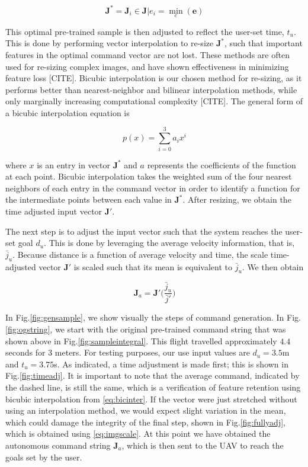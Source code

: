\documentclass[letterpaper, 10 pt, conference]{ieeeconf}  %
\begin{document}
\begin{equation}
\mathbf{J}^* = \mathbf{J}_i \in \mathbf{J}\vert e_i = \min_e(\mathbf{e})
\end{equation}

This optimal pre-trained sample is then adjusted to reflect the user-set time, $t_u$. This is done by performing vector interpolation to re-size $\mathbf{J}^*$, such that important features in the optimal command vector are not lost. These methods are often used for re-sizing complex images, and have shown effectiveness in minimizing feature loss [CITE]. Bicubic interpolation is our chosen method for re-sizing, as it performs better than nearest-neighbor and bilinear interpolation methods, while only marginally increasing computational complexity [CITE]. The general form of a bicubic interpolation equation is 

\begin{equation} \label{eq:bicinter}
    p(x) = \sum_{i=0}^3a_ix^i
\end{equation}

where $x$ is an entry in vector $\mathbf{J}^*$ and $a$ represents the coefficients of the function at each point. Bicubic interpolation takes the weighted sum of the four nearest neighbors of each entry in the command vector in order to identify a function for the intermediate points between each value in $\mathbf{J}^*$. After resizing, we obtain the time adjusted input vector $\mathbf{J}'$.

The next step is to adjust the input vector such that the system reaches the user-set goal $d_u$. This is done by leveraging the average velocity information, that is, $\bar{j}_u$. Because distance is a function of average velocity and time, the scale time-adjusted vector $\mathbf{J}'$ is scaled such that its mean is equivalent to $\bar{j}_u$. We then obtain

\begin{equation} \label{eq:imgscale}
\mathbf{J}_a = \mathbf{J}'\bigg(\frac{\bar{j}_u}{\bar{j}'}\bigg)
\end{equation}

In Fig.\ref{fig:gensample}, we show visually the steps of command generation. In Fig.\ref{fig:ogstring}, we start with the original pre-trained command string that was shown above in Fig.\ref{fig:sampleintegral}. This flight travelled approximately $4.4$ seconds for $3$ meters. For testing purposes, our use input values are $d_u=3.5$m and $t_u=3.75$s. As indicated, a time adjustment is made first; this is shown in Fig.\ref{fig:timeadj}. It is important to note that the average command, indicated by the dashed line, is still the same, which is a verification of feature retention using bicubic interpolation from \eqref{eq:bicinter}. If the vector were just stretched without using an interpolation method, we would expect slight variation in the mean, which could damage the integrity of the final step, shown in Fig.\ref{fig:fullyadj}, which is obtained using \eqref{eq:imgscale}. At this point we have obtained the autonomous command string $\mathbf{J}_a$, which is then sent to the UAV to reach the goals set by the user.
\end{document}
